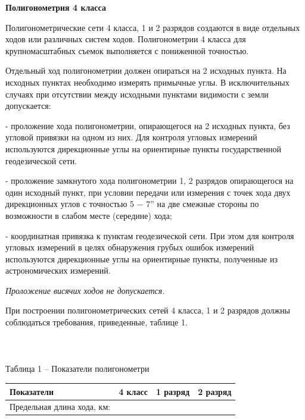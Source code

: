 \documentclass[a4paper]{article}
\begin{document}
\begin{newpage}

    \large{
        \begin{center}
            \textbf{Полигонометрия 4 класса}
        \end{center}
        
        \par Полигонометрические сети 4 класса, 1 и 2 разрядов создаются в виде отдельных ходов или различных систем ходов. Полигонометрии 4 класса для крупномасштабных съемок выполняется с пониженной точностью.
        \par Отдельный ход полигонометрии должен опираться на 2 исходных пункта. На исходных пунктах необходимо измерять примычные углы. В исключительных случаях при отсутствии между исходными пунктами видимости с земли допускается:
        \par - проложение хода полигонометрии, опирающегося на 2 исходных пункта, без угловой привязки на одном из них. Для контроля угловых измерений используются дирекционные углы на ориентирные пункты государственной геодезической сети.
        \par - проложение замкнутого хода полигонометрии 1, 2 разрядов опирающегося на один исходный пункт, при условии передачи или измерения с точек хода двух дирекционных углов с точностью 5 − 7” на две смежные стороны по возможности в слабом месте (середине) хода;
        \par - координатная привязка к пунктам геодезической сети. При этом для контроля угловых измерений в целях обнаружения грубых ошибок измерений используются дирекционные углы на ориентирные пункты, полученные из астрономических измерений.
        \par\textit{Проложение висячих ходов не допускается.}
        \par При построении полигонометрических сетей 4 класса, 1 и 2 разрядов должны соблюдаться требования, приведенные, таблице 1.
        \\
        \\
        \\
        \\
        Таблица 1 – Показатели полигонометри
        \begin{center}
            \normalsize{
                \begin{tabular}{|p{280pt}|c|c|c|}
                    \hline
                    Показатели & 4 класс & 1 разряд & 2 разряд\\
                    \hline
                    Предельная длина хода, км: &  &  &\\

\end{tabular}}
\end{center}}
\end{newpage}
\end{document}
